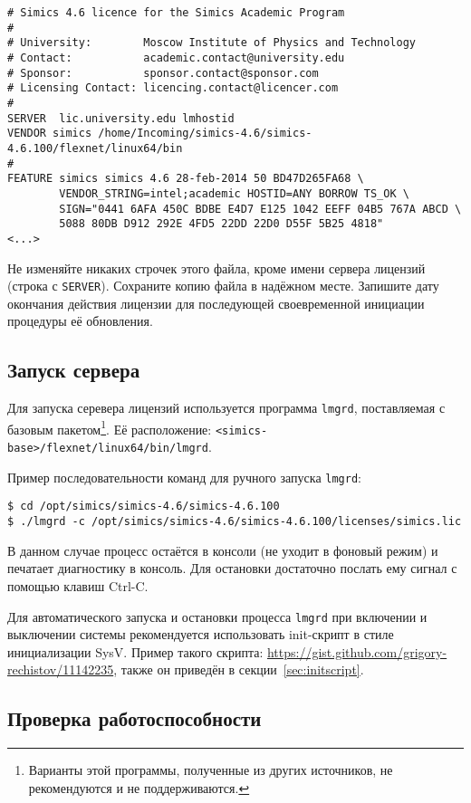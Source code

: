 \begin{lstlisting}
# Simics 4.6 licence for the Simics Academic Program
#
# University:        Moscow Institute of Physics and Technology
# Contact:           academic.contact@university.edu
# Sponsor:           sponsor.contact@sponsor.com
# Licensing Contact: licencing.contact@licencer.com
#
SERVER  lic.university.edu lmhostid
VENDOR simics /home/Incoming/simics-4.6/simics-4.6.100/flexnet/linux64/bin
#
FEATURE simics simics 4.6 28-feb-2014 50 BD47D265FA68 \
        VENDOR_STRING=intel;academic HOSTID=ANY BORROW TS_OK \
        SIGN="0441 6AFA 450C BDBE E4D7 E125 1042 EEFF 04B5 767A ABCD \
        5088 80DB D912 292E 4FD5 22DD 22D0 D55F 5B25 4818"
<...>
\end{lstlisting}

Не изменяйте никаких строчек этого файла, кроме имени сервера лицензий (строка с \texttt{SERVER}). Сохраните копию файла в надёжном месте. Запишите дату окончания действия лицензии для последующей своевременной инициации процедуры её обновления.

\subsection{Запуск сервера}

Для запуска серевера лицензий используется программа \texttt{lmgrd}, поставляемая с базовым пакетом\footnote{Варианты этой программы, полученные из других источников, не рекомендуются и не поддерживаются.}. Её расположение: \texttt{<simics-base>/flexnet/linux64/bin/lmgrd}.

Пример последовательности команд для ручного запуска \texttt{lmgrd}:
\begin{lstlisting}
$ cd /opt/simics/simics-4.6/simics-4.6.100
$ ./lmgrd -c /opt/simics/simics-4.6/simics-4.6.100/licenses/simics.lic
\end{lstlisting}

В данном случае процесс остаётся в консоли (не уходит в фоновый режим) и печатает диагностику в консоль. Для остановки достаточно послать ему сигнал с помощью клавиш Ctrl-C.

Для автоматического запуска и остановки процесса \texttt{lmgrd} при включении и выключении системы рекомендуется использовать init-скрипт в стиле инициализации SysV. Пример такого скрипта: \url{https://gist.github.com/grigory-rechistov/11142235}, также он приведён в секции~\ref{sec:initscript}.

\subsection{Проверка работоспособности}

